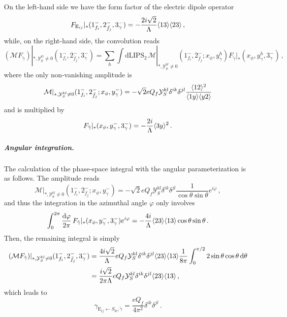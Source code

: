 On the left-hand side we have the form factor of the electric dipole operator
\begin{equation}
    F_{\text{E}_{ij}}|_*(1^-_{f_i},2^-_{\bar f_j},3^-_\gamma) = -\frac{2i \sqrt{2}}{\Lambda} \langle 1 3 \rangle\langle 2 3 \rangle\,,
\end{equation}
while, on the right-hand side, the convolution reads
\begin{equation}
    (\mathcal M F_{\tilde\gamma})|_{*,\mathcal Y_S^{kl}\neq 0}(1^-_{f_i},2^-_{\bar f_j},3^-_\gamma) = \sum_{h} \int \text{dLIPS}_2 \, \mathcal M|_{*,\mathcal Y_S^{kl}\neq 0}(1^-_{f_i},2^-_{\bar f_j};x_\phi,y^h_\gamma) F_{\tilde\gamma}|_*(x_\phi,y^h_\gamma,3_\gamma^-)\,,
\end{equation}
where the only non-vanishing amplitude is
\begin{equation}
    \mathcal M|_{*,\mathcal Y_S^{kl}\neq 0}(1^-_{f_i},2^-_{\bar f_j};x_\phi,y^-_\gamma) =  -\sqrt 2 eQ_f \mathcal Y_S^{kl}\delta^{ik}\delta^{jl} \frac{\langle 1 2 \rangle^2}{\langle 1 y \rangle\langle y 2 \rangle}
\end{equation}
and is multiplied by
\begin{equation}
    F_{\tilde\gamma}|_*(x_\phi,y^-_\gamma,3_\gamma^-) = -\frac{2i}{\Lambda}\langle 3 y \rangle^2\,.
\end{equation}

\subparagraph{Angular integration.}
The calculation of the phase-space integral with the angular parameterization is as follows.
The amplitude reads
\begin{equation}
    \mathcal M|_{*,\mathcal Y_S^{kl}\neq 0}(1^-_{f_i},2^-_{\bar f_j};x_\phi,y^-_\gamma) =  -\sqrt 2 eQ_f \mathcal Y_S^{kl}\delta^{ik}\delta^{jl} \frac{1}{\cos\theta \sin\theta}e^{i\varphi}\,,
\end{equation}
and thus the integration in the azimuthal angle $\varphi$ only involves
\begin{equation}
    \int_0^{2\pi}\frac{\text{d}\varphi}{2\pi}\,F_{\tilde\gamma}|_*(x_\phi,y^-_\gamma,3_\gamma^-)e^{i\varphi} = - \frac{4i}{\Lambda}\langle 2 3 \rangle\langle 1 3 \rangle\cos\theta\sin\theta\,.
\end{equation}
Then, the remaining integral is simply
\begin{align}
    (\mathcal M F_{\tilde\gamma})|_{*,\mathcal Y_S^{kl}\neq 0}(1^-_{f_i},2^-_{\bar f_j},3^-_\gamma) &=  \frac{4 i\sqrt 2}{\Lambda}  eQ_f \mathcal Y_S^{kl}\delta^{ik}\delta^{jl}  \langle 2 3 \rangle\langle 1 3 \rangle \frac{1}{8\pi}\int_0^{\pi/2}2\sin\theta\cos\theta\,\text{d}\theta \nonumber \\
    &=  \frac{ i\sqrt 2}{2\pi\Lambda}  eQ_f \mathcal Y_S^{kl}\delta^{ik}\delta^{jl}  \langle 2 3 \rangle\langle 1 3 \rangle\,,
\end{align}
which leads to
\begin{equation}\label{eq:ALPgammaEfromSgammatilde}
    \gamma_{\text{E}_{ij}\leftarrow S_{kl},\tilde\gamma} =  \frac{eQ_f }{4\pi^2}\delta^{ik}\delta^{jl}\,.
\end{equation}

